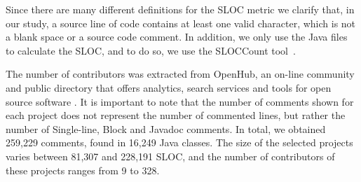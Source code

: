 Since there are many different definitions for the SLOC metric we clarify that, in our study, a source line of code contains at least one valid character, which is not a blank space or a source code comment. In addition, we only use the Java files to calculate the SLOC, and to do so, we use the SLOCCount tool~\cite{wheeler2004:home}. 

The number of contributors was extracted from OpenHub, an on-line community and public directory that offers analytics, search services and tools for open source software \cite{Openhub:home}. It is important to note that the number of comments shown for each project does not represent the number of commented lines, but rather the number of Single-line, Block and Javadoc comments. In total, we obtained 259,229 comments, found in 16,249 Java classes. The size of the selected projects varies between 81,307 and 228,191 SLOC, and the number of contributors of these projects ranges from 9 to 328. 

